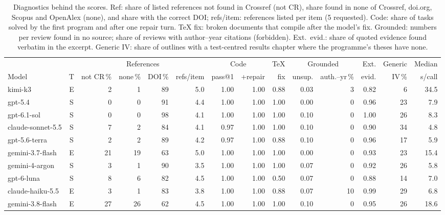 \begin{table}[t]
  \caption{Diagnostics behind the scores. Ref: share of listed references not found in Crossref (not CR), share found in none of Crossref, doi.org, Scopus and OpenAlex (none), and share with the correct DOI; refs/item: references listed per item (5 requested). Code: share of tasks solved by the first program and after one repair turn. TeX fix: broken documents that compile after the model's fix. Grounded: numbers per review found in no source; share of reviews with author--year citations (forbidden). Ext.\ evid.: share of quoted evidence found verbatim in the excerpt. Generic IV: share of outlines with a test-centred results chapter where the programme's theses have none.}
  \label{tab:diagnostics}
  \centering
  \scriptsize
  \setlength{\tabcolsep}{3pt}
  \begin{tabular}{@{}l c r r r r r r r r r r r r@{}}
    \toprule
    & & \multicolumn{4}{c}{References} & \multicolumn{2}{c}{Code} & TeX & \multicolumn{2}{c}{Grounded} & Ext. & Generic & Median \\
    \cmidrule(lr){3-6}\cmidrule(lr){7-8}\cmidrule(lr){10-11}
    Model & T & not CR\,\% & none\,\% & DOI\,\% & refs/item & pass@1 & +repair & fix & unsup. & auth.--yr\,\% & evid. & IV\,\% & s/call \\
    \midrule
    kimi-k3 & E & 2 & 1 & 89 & 5.0 & 1.00 & 1.00 & 0.88 & 0.03 & 3 & 0.82 & 6 & 34.5 \\
    gpt-5.4 & S & 0 & 0 & 91 & 4.4 & 1.00 & 1.00 & 1.00 & 0.00 & 0 & 0.96 & 23 & 7.9 \\
    gpt-6.1-sol & S & 0 & 0 & 98 & 4.1 & 1.00 & 1.00 & 1.00 & 0.10 & 0 & 1.00 & 26 & 8.3 \\
    claude-sonnet-5.5 & S & 7 & 2 & 84 & 4.1 & 0.97 & 1.00 & 1.00 & 0.10 & 0 & 0.90 & 34 & 4.8 \\
    gpt-5.6-terra & S & 2 & 2 & 89 & 4.2 & 0.97 & 1.00 & 0.88 & 0.10 & 0 & 0.96 & 17 & 5.9 \\
    gemini-3.7-flash & E & 21 & 19 & 63 & 5.0 & 1.00 & 1.00 & 1.00 & 0.00 & 0 & 0.93 & 23 & 15.4 \\
    gemini-4-argon & S & 3 & 1 & 90 & 3.5 & 1.00 & 1.00 & 1.00 & 0.07 & 0 & 0.92 & 26 & 5.8 \\
    gpt-6-luna & S & 8 & 6 & 82 & 4.5 & 1.00 & 1.00 & 0.50 & 0.07 & 0 & 0.88 & 14 & 7.0 \\
    claude-haiku-5.5 & E & 3 & 1 & 83 & 3.8 & 1.00 & 1.00 & 0.88 & 0.07 & 10 & 0.99 & 29 & 6.8 \\
    gemini-3.8-flash & E & 27 & 26 & 62 & 4.5 & 1.00 & 1.00 & 1.00 & 0.10 & 0 & 0.95 & 26 & 18.6 \\

\end{tabular}
\end{table}
